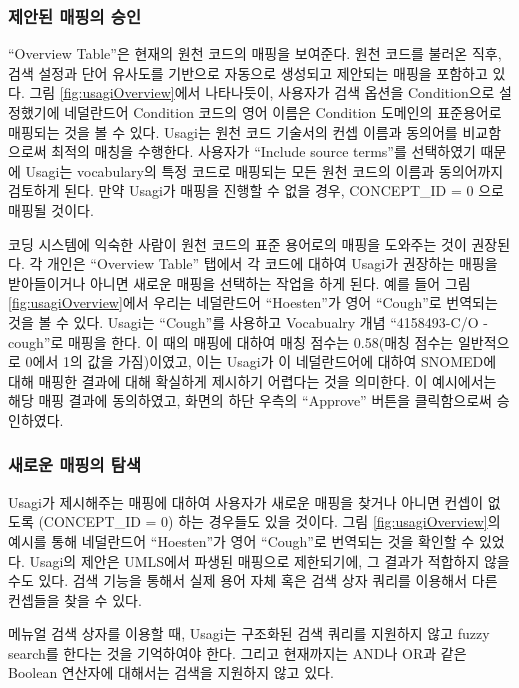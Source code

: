 \documentclass[11pt]{book}
\theoremstyle{definition}
\theoremstyle{definition}
\theoremstyle{definition}
\theoremstyle{remark}
\begin{document}
\subsubsection*{제안된 매핑의 승인}\label{--}

``Overview Table''은 현재의 원천 코드의 매핑을 보여준다. 원천 코드를
불러온 직후, 검색 설정과 단어 유사도를 기반으로 자동으로 생성되고
제안되는 매핑을 포함하고 있다. 그림 \ref{fig:usagiOverview}에서
나타나듯이, 사용자가 검색 옵션을 Condition으로 설정했기에 네덜란드어
Condition 코드의 영어 이름은 Condition 도메인의 표준용어로 매핑되는 것을
볼 수 있다. Usagi는 원천 코드 기술서의 컨셉 이름과 동의어를 비교함으로써
최적의 매칭을 수행한다. 사용자가 ``Include source terms''를 선택하였기
때문에 Usagi는 vocabulary의 특정 코드로 매핑되는 모든 원천 코드의 이름과
동의어까지 검토하게 된다. 만약 Usagi가 매핑을 진행할 수 없을 경우,
CONCEPT\_ID = 0 으로 매핑될 것이다.

코딩 시스템에 익숙한 사람이 원천 코드의 표준 용어로의 매핑을 도와주는
것이 권장된다. 각 개인은 ``Overview Table'' 탭에서 각 코드에 대하여
Usagi가 권장하는 매핑을 받아들이거나 아니면 새로운 매핑을 선택하는
작업을 하게 된다. 예를 들어 그림 \ref{fig:usagiOverview}에서 우리는
네덜란드어 ``Hoesten''가 영어 ``Cough''로 번역되는 것을 볼 수 있다.
Usagi는 ``Cough''를 사용하고 Vocabualry 개념 ``4158493-C/O - cough''로
매핑을 한다. 이 때의 매핑에 대하여 매칭 점수는 0.58(매칭 점수는
일반적으로 0에서 1의 값을 가짐)이였고, 이는 Usagi가 이 네덜란드어에
대하여 SNOMED에 대해 매핑한 결과에 대해 확실하게 제시하기 어렵다는 것을
의미한다. 이 예시에서는 해당 매핑 결과에 동의하였고, 화면의 하단 우측의
``Approve'' 버튼을 클릭함으로써 승인하였다.

\subsubsection*{새로운 매핑의 탐색}\label{--}

Usagi가 제시해주는 매핑에 대하여 사용자가 새로운 매핑을 찾거나 아니면
컨셉이 없도록 (CONCEPT\_ID = 0) 하는 경우들도 있을 것이다. 그림
\ref{fig:usagiOverview}의 예시를 통해 네덜란드어 ``Hoesten''가 영어
``Cough''로 번역되는 것을 확인할 수 있었다. Usagi의 제안은 UMLS에서
파생된 매핑으로 제한되기에, 그 결과가 적합하지 않을 수도 있다. 검색
기능을 통해서 실제 용어 자체 혹은 검색 상자 쿼리를 이용해서 다른
컨셉들을 찾을 수 있다.

메뉴얼 검색 상자를 이용할 때, Usagi는 구조화된 검색 쿼리를 지원하지 않고
fuzzy search를 한다는 것을 기억하여야 한다. 그리고 현재까지는 AND나 OR과
같은 Boolean 연산자에 대해서는 검색을 지원하지 않고 있다.
\end{document}
